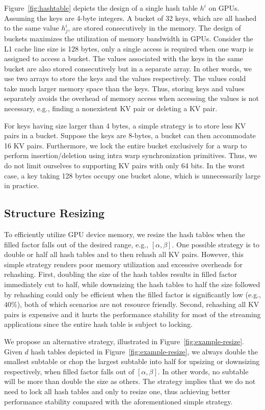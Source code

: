Figure~\ref{fig:hashtable} depicts the design of a single hash table $h^i$ on GPUs. 
Assuming the keys are 4-byte integers. A bucket of 32 keys, which are all hashed to the same value $h^i_j$, are stored consecutively in the memory. 
The design of buckets maximizes the utilization of memory bandwidth in GPUs. 
Consider the L1 cache line size is 128 bytes, only a single access is required when one warp is assigned to access a bucket. 
The values associated with the keys in the same bucket are also stored consecutively but in a separate array.   
In other words, we use two arrays to store the keys and the values respectively.
The values could take much larger memory space than the keys. 
Thus, storing keys and values separately avoids the overhead of memory access when accessing the values is not necessary, 
e.g., finding a nonexistent KV pair or deleting a KV pair. 

For keys having size larger than 4 bytes, a simple strategy is to store less KV pairs in a bucket. Suppose the keys are 8-bytes, a bucket can then accommodate 16 KV pairs. 
Furthermore, we lock the entire bucket exclusively for a warp to perform insertion/deletion using intra warp synchronization primitives. Thus, we do not limit ourselves to supporting KV pairs with only 64 bits. 
In the worst case, a key taking 128 bytes occupy one bucket alone, which is unnecessarily large in practice.

\subsection{Structure Resizing}\label{sec:dyn:resize}
To efficiently utilize GPU device memory, we resize the hash tables when the filled factor falls out of the desired range, e.g., $[\alpha,\beta]$.
One possible strategy is to double or half all hash tables and to then rehash all KV pairs. However, this simple strategy renders poor memory utilization and 
excessive overheads for rehashing. First, doubling the size of the hash tables results in filled factor immediately cut to half, while downsizing the hash tables to half the size followed by rehashing could only be efficient when the filled factor is significantly low (e.g., $40\%$), both of which scenarios are not resource friendly. Second, rehashing all KV pairs is expensive and it hurts the performance stability for most of the streaming applications since the entire hash table is subject to locking. 

We propose an alternative strategy, illustrated in Figure~\ref{fig:example-resize}. 
Given $d$ hash tables depicted in Figure~\ref{fig:example-resize},
we always double the smallest subtable or chop the largest subtable into half for upsizing or downsizing respectively, when filled factor falls out of $[\alpha,\beta]$. 
In other words, no subtable will be more than double the size as others. The strategy implies that we do not need to lock all hash tables and only to resize one, thus achieving better performance stability compared with the aforementioned simple strategy. 

